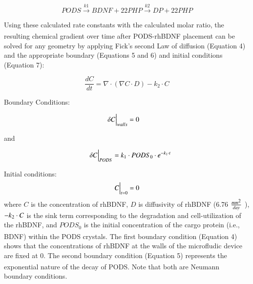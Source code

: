 \documentclass[review]{elsarticle}
\begin{document}
 
 
 \begin{equation}
 	PODS\overset{k1}{\longrightarrow}BDNF + 22PHP\overset{k2}{\longrightarrow}DP + 22PHP
 \end{equation}

 
 Using these calculated rate constants with the calculated molar ratio, the resulting chemical gradient over time after PODS\textsuperscript{\textregistered}-rhBDNF placement can be solved for any geometry by applying Fick’s second Law of diffusion (Equation 4) and the appropriate boundary (Equations 5 and 6) and initial conditions (Equation 7): 

\begin{equation}
\renewcommand{\vec}[1]{\boldsymbol{#1}}
\frac{dC}{dt}
= \nabla\cdot\left(\nabla C\cdot D\right)-k_{2}\cdot C
\end{equation}

Boundary Conditions:

\begin{equation}
\delta C \Big{|}_{walls}= 0\quad 
\end{equation}

\begin{center}
and
\end{center}

\begin{equation}
\quad\delta C\Big{|}_{PODS}
=k_1 \cdot PODS_0 \cdot e^{-k_1 \cdot t}
\end{equation}

Initial conditions: 
\begin{equation}
C\Big{|}_{t=0} = 0
\end{equation}
where $C$ is the concentration of rhBDNF, $D$ is diffusivity of rhBDNF (6.76 $\frac{mm\textsuperscript{2}}{day} $ \cite{Stroh2004}), $-k\textsubscript{2}\cdot C$ is the sink term corresponding to the degradation and cell-utilization of the rhBDNF, and $PODS_{0}$ is the initial concentration of the cargo protein (i.e., BDNF) within the PODS\textsuperscript{\textregistered} crystals. The first boundary condition (Equation 4) shows that the concentrations of rhBDNF at the walls of the microfludic device are fixed at 0. The second boundary condition (Equation 5) represents the exponential nature of the decay of PODS\textsuperscript{\textregistered}. Note that both are Neumann boundary conditions. 
\end{document}
